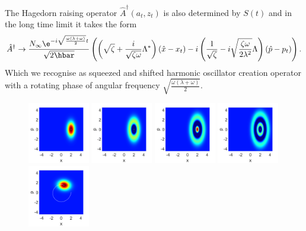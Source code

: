 \documentclass[12pt]{iopart} %
\begin{document}
The Hagedorn raising operator $\hat{A}^{\dagger}(a_t,z_t)$ is also determined by $S(t)$ and in the long time limit it takes the form
\begin{equation}
    \hat{A}^{\dagger}\to \frac{N_{\infty}\e^{-i\sqrt{\frac{\omega(\lambda+\omega)}{2}}t}}{\sqrt{2 \hbar}}\left(\left(\sqrt{\zeta}+\frac{i}{\sqrt{\zeta \omega}}\Lambda^{*} \right)(\hat  x-x_t )-i\left(\frac{1}{\sqrt{\zeta}}-i\sqrt{\frac{\zeta \omega}{2 \lambda^2}}\Lambda \right) (\hat p-p_t) \right).
\end{equation}
Which we recognise as squeezed and shifted harmonic oscillator creation operator with a rotating phase of angular frequency $\sqrt{\tfrac{\omega(\lambda+\omega)}{2}}$.
\begin{figure}
\begin{centering}
  	  \includegraphics[width=0.24\textwidth]{State0t0Pos.pdf}
	  \includegraphics[width=0.24\textwidth]{State1t0Pos.pdf}
	  \includegraphics[width=0.24\textwidth]{State2t0Pos.pdf}
	  \includegraphics[width=0.24\textwidth]{State3t0Pos.pdf}\\
	  \includegraphics[width=0.24\textwidth]{State0t5Pos.pdf}

\end{centering}
\end{figure}
\end{document}
